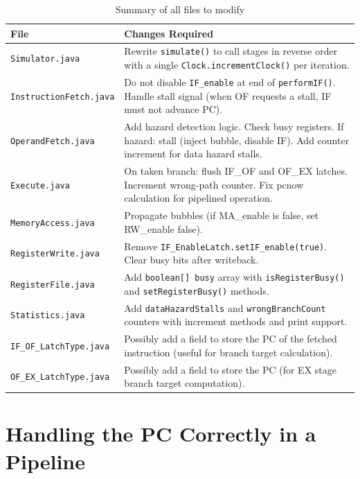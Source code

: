 \documentclass[12pt,a4paper]{article}
\begin{document}
\begin{table}[H]
\centering
\begin{tabular}{@{}lp{10cm}@{}}
\toprule
\textbf{File} & \textbf{Changes Required} \\
\midrule
\texttt{Simulator.java} & Rewrite \texttt{simulate()} to call stages in reverse order with a single \texttt{Clock.incrementClock()} per iteration. \\
\texttt{InstructionFetch.java} & Do not disable \texttt{IF\_enable} at end of \texttt{performIF()}. Handle stall signal (when OF requests a stall, IF must not advance PC). \\
\texttt{OperandFetch.java} & Add hazard detection logic. Check busy registers. If hazard: stall (inject bubble, disable IF). Add counter increment for data hazard stalls. \\
\texttt{Execute.java} & On taken branch: flush IF\_OF and OF\_EX latches. Increment wrong-path counter. Fix pcnow calculation for pipelined operation. \\
\texttt{MemoryAccess.java} & Propagate bubbles (if MA\_enable is false, set RW\_enable false). \\
\texttt{RegisterWrite.java} & Remove \texttt{IF\_EnableLatch.setIF\_enable(true)}. Clear busy bits after writeback. \\
\texttt{RegisterFile.java} & Add \texttt{boolean[] busy} array with \texttt{isRegisterBusy()} and \texttt{setRegisterBusy()} methods. \\
\texttt{Statistics.java} & Add \texttt{dataHazardStalls} and \texttt{wrongBranchCount} counters with increment methods and print support. \\
\texttt{IF\_OF\_LatchType.java} & Possibly add a field to store the PC of the fetched instruction (useful for branch target calculation). \\
\texttt{OF\_EX\_LatchType.java} & Possibly add a field to store the PC (for EX stage branch target computation). \\
\bottomrule
\end{tabular}
\caption{Summary of all files to modify}
\end{table}

\section{Handling the PC Correctly in a Pipeline}
\end{document}
